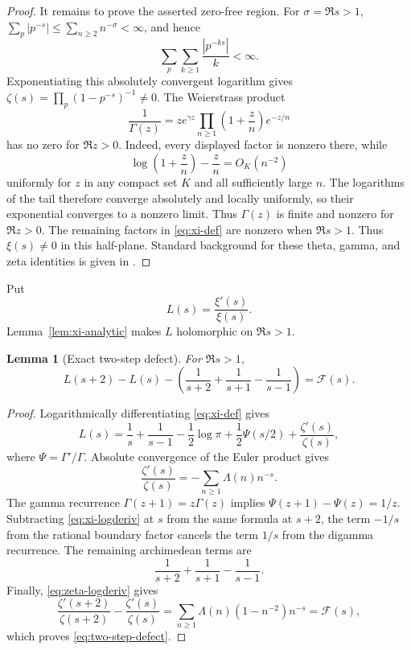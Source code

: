 \documentclass[11pt]{article}
\numberwithin{equation}{section}
\newtheorem{lemma}[theorem]{Lemma}
\theoremstyle{definition}
\theoremstyle{remark}
\begin{document}
\begin{proof}
It remains to prove the asserted zero-free region.  For $\sigma=\Re s>1$,
$\sum_p|p^{-s}|\leq\sum_{n\geq2}n^{-\sigma}<\infty$, and hence
\[
 \sum_p\sum_{k\geq1}\frac{|p^{-ks}|}{k}<\infty.
\]
Exponentiating this absolutely convergent logarithm gives
$\zeta(s)=\prod_p(1-p^{-s})^{-1}\neq0$.  The Weierstrass product
\[
 \frac1{\Gamma(z)}=ze^{\gamma z}
   \prod_{n\geq1}\left(1+\frac zn\right)e^{-z/n}
\]
has no zero for $\Re z>0$.  Indeed, every displayed factor is nonzero there, while
\[
 \log\!\left(1+\frac zn\right)-\frac zn=O_K(n^{-2})
\]
uniformly for $z$ in any compact set $K$ and all sufficiently large $n$.  The logarithms of the
tail therefore converge absolutely and locally uniformly, so their exponential converges to a
nonzero limit.  Thus $\Gamma(z)$ is finite and nonzero for $\Re z>0$.  The remaining factors in
\eqref{eq:xi-def} are nonzero when $\Re s>1$.  Thus $\xi(s)\neq0$ in this half-plane.  Standard
background for these theta, gamma, and zeta identities is given in \cite{Titchmarsh1986}.
\end{proof}

Put
\[
 L(s)=\frac{\xi'(s)}{\xi(s)}.
\]
Lemma~\ref{lem:xi-analytic} makes $L$ holomorphic on $\Re s>1$.

\begin{lemma}[Exact two-step defect]
\label{lem:two-step}
For $\Re s>1$,
\begin{equation}
 L(s+2)-L(s)-\left(\frac1{s+2}+\frac1{s+1}-\frac1{s-1}\right)
 =\mathcal F(s).
 \label{eq:two-step-defect}
\end{equation}
\end{lemma}

\begin{proof}
Logarithmically differentiating \eqref{eq:xi-def} gives
\begin{equation}
 L(s)=\frac1s+\frac1{s-1}-\frac12\log\pi
       +\frac12\Psi(s/2)+\frac{\zeta'(s)}{\zeta(s)},
 \label{eq:xi-logderiv}
\end{equation}
where $\Psi=\Gamma'/\Gamma$.  Absolute convergence of the Euler product gives
\begin{equation}
 \frac{\zeta'(s)}{\zeta(s)}
 =-\sum_{n\geq1}\Lambda(n)n^{-s}.
 \label{eq:zeta-logderiv}
\end{equation}
The gamma recurrence $\Gamma(z+1)=z\Gamma(z)$ implies
$\Psi(z+1)-\Psi(z)=1/z$.  Subtracting \eqref{eq:xi-logderiv} at $s$ from the same formula at
$s+2$, the term $-1/s$ from the rational boundary factor cancels the term $1/s$ from the digamma
recurrence.  The remaining archimedean terms are
\[
 \frac1{s+2}+\frac1{s+1}-\frac1{s-1}.
\]
Finally, \eqref{eq:zeta-logderiv} gives
\[
 \frac{\zeta'(s+2)}{\zeta(s+2)}-
 \frac{\zeta'(s)}{\zeta(s)}
 =\sum_{n\geq1}\Lambda(n)(1-n^{-2})n^{-s}=\mathcal F(s),
\]
which proves \eqref{eq:two-step-defect}.
\end{proof}
\end{document}

